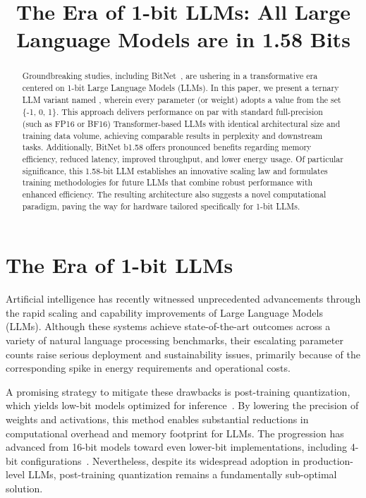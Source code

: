 \title{The Era of 1-bit LLMs: All Large Language Models are in 1.58 Bits}

\begin{abstract}
Groundbreaking studies, including BitNet~\cite{bitnet}, are ushering in a transformative era centered on 1-bit Large Language Models (LLMs). In this paper, we present a ternary LLM variant named \textbf{}, wherein every parameter (or weight) adopts a value from the set \{-1, 0, 1\}. This approach delivers performance on par with standard full-precision (such as FP16 or BF16) Transformer-based LLMs with identical architectural size and training data volume, achieving comparable results in perplexity and downstream tasks. Additionally, BitNet b1.58 offers pronounced benefits regarding memory efficiency, reduced latency, improved throughput, and lower energy usage. Of particular significance, this 1.58-bit LLM establishes an innovative scaling law and formulates training methodologies for future LLMs that combine robust performance with enhanced efficiency. The resulting architecture also suggests a novel computational paradigm, paving the way for hardware tailored specifically for 1-bit LLMs.
\end{abstract}

\section{The Era of 1-bit LLMs}

Artificial intelligence has recently witnessed unprecedented advancements through the rapid scaling and capability improvements of Large Language Models (LLMs). Although these systems achieve state-of-the-art outcomes across a variety of natural language processing benchmarks, their escalating parameter counts raise serious deployment and sustainability issues, primarily because of the corresponding spike in energy requirements and operational costs.

A promising strategy to mitigate these drawbacks is post-training quantization, which yields low-bit models optimized for inference~\cite{smoothquant, gptq, quip, quip_sharp}. By lowering the precision of weights and activations, this method enables substantial reductions in computational overhead and memory footprint for LLMs. The progression has advanced from 16-bit models toward even lower-bit implementations, including 4-bit configurations~\cite{gptq, awq}. Nevertheless, despite its widespread adoption in production-level LLMs, post-training quantization remains a fundamentally sub-optimal solution.

